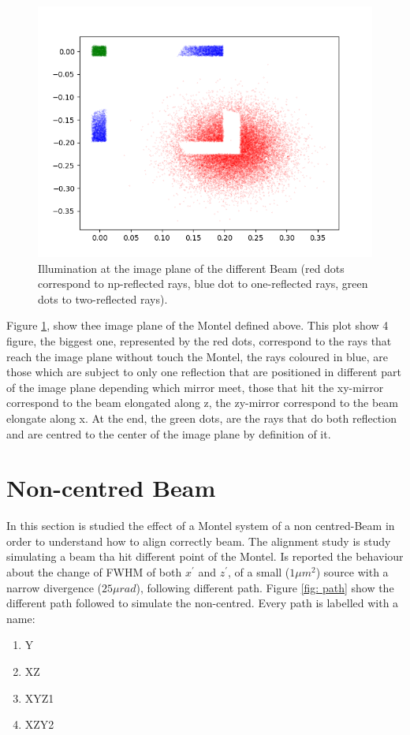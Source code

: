 %
\begin{figure}[]
%
\centering
%
\includegraphics[width=.6\textwidth]{Immagini/Chapter4/BigSourceMontel}
%
\caption{Illumination at the image plane of the different Beam (red dots correspond to np-reflected rays, blue dot to one-reflected rays, green dots to two-reflected rays).}
%
\label{fig:BigSourceMontel}
%
\end{figure}
%
Figure \ref{fig:BigSourceMontel}, show thee image plane of the Montel defined above. This plot show 4 figure, the biggest one, represented by the red dots, correspond to the rays that reach the image plane without touch the Montel, the rays coloured in blue, are those which are subject to only one reflection that are positioned in different part of the image plane depending which mirror meet, those that hit the xy-mirror correspond to the beam elongated along z, the zy-mirror correspond to the beam elongate along x. At the end, the green dots, are the rays that do both reflection and are centred to the center of the image plane by definition of it.


\section{Non-centred Beam}
In this section is studied the effect of a Montel system of a non centred-Beam in order to understand how to align correctly beam. The alignment study is study simulating a beam tha hit different point of the Montel. Is reported the behaviour about the change of FWHM of both $x^{'} $ and $z^{'} $, of a small ($1 \mu m^2 $) source with a narrow divergence ($25 \mu rad $), following different path. Figure \ref{fig: path} show the different path followed to simulate the non-centred. Every path is labelled with a name:
\begin{enumerate}
	\item Y
	\item XZ
	\item XYZ1
	\item XZY2
\end{enumerate}

